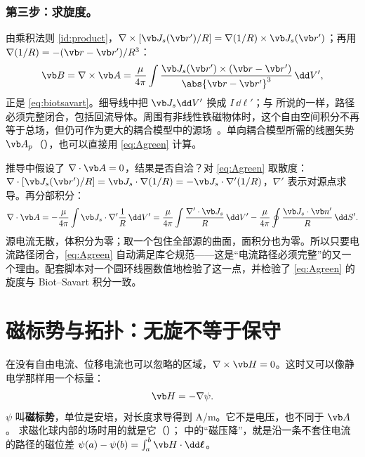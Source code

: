 \subsubsection{第三步：求旋度。} 由乘积法则 \eqref{id:product}，$\nabla\times[\vb J_s(\vb r')/R]=\nabla(1/R)\times\vb J_s(\vb r')$；再用 $\nabla(1/R)=-(\vb r-\vb r')/R^3$：
\begin{equation*}
\vb B=\nabla\times\vb A=\frac{\mu}{4\pi}\int\frac{\vb J_s(\vb r')\times(\vb r-\vb r')}{\abs{\vb r-\vb r'}^3}\,\dd V' ,
\end{equation*}
正是 \eqref{eq:biotsavart}。细导线中把 $\vb J_s\dd V'$ 换成 $I\,\dd\boldsymbol\ell'$；与 所说的一样，路径必须完整闭合，包括回流导体。周围有非线性铁磁物体时，这个自由空间积分不再等于总场，但仍可作为更大的耦合模型中的源场~\cite{haus}。单向耦合模型所需的线圈矢势 $\vb A_p$（），也可以直接用 \eqref{eq:Agreen} 计算。

\begin{deeper}
推导中假设了 $\nabla\cdot\vb A=0$，结果是否自洽？对 \eqref{eq:Agreen} 取散度：$\nabla\cdot[\vb J_s(\vb r')/R]=\vb J_s\cdot\nabla(1/R)=-\vb J_s\cdot\nabla'(1/R)$，$\nabla'$ 表示对源点求导。再分部积分：
\begin{equation*}
\nabla\cdot\vb A=-\frac{\mu}{4\pi}\int\vb J_s\cdot\nabla'\frac1R\,\dd V'=\frac{\mu}{4\pi}\int\frac{\nabla'\cdot\vb J_s}{R}\,\dd V'-\frac{\mu}{4\pi}\oint\frac{\vb J_s\cdot\vb n'}{R}\,\dd S' .
\end{equation*}
源电流无散，体积分为零；取一个包住全部源的曲面，面积分也为零。所以只要电流路径闭合，\eqref{eq:Agreen} 自动满足库仑规范——这是“电流路径必须完整”的又一个理由。配套脚本对一个圆环线圈数值地检验了这一点，并检验了 \eqref{eq:Agreen} 的旋度与 Biot–Savart 积分一致。
\end{deeper}


\section{磁标势与拓扑：无旋不等于保守}\label{sec:potentials-scalar}

在没有自由电流、位移电流也可以忽略的区域，$\nabla\times\vb H=0$。这时又可以像静电学那样用一个标量：
\begin{equation}
\vb H=-\nabla\psi .
\end{equation}
$\psi$ 叫\textbf{磁标势}，单位是安培，对长度求导得到 A/m。它不是电压，也不同于 $\vb A$。 求磁化球内部的场时用的就是它（）； 中的“磁压降”，就是沿一条不套住电流的路径的磁位差 $\psi(a)-\psi(b)=\int_a^b\vb H\cdot\dd\boldsymbol\ell$。

